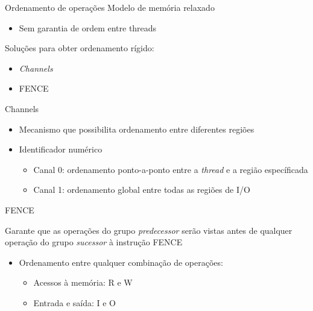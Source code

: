 \documentclass[brazil,nolapesd,aspectratio=169,noartschool]{lapesd-slides}
\begin{document}
	\begin{frame}{Ordenamento de operações}
		Modelo de memória relaxado
		\begin{itemize}
			\item Sem garantia de ordem entre threads
		\end{itemize}

		\vspace{1em}

		Soluções para obter ordenamento rígido:
		\begin{itemize}
			\item \textit{Channels}
			\item FENCE
		\end{itemize}
	\end{frame}

	\begin{frame}{Channels}
		\begin{itemize}
			\item Mecanismo que possibilita ordenamento entre diferentes regiões
			\item Identificador numérico
			\begin{itemize}
				\item Canal 0: ordenamento ponto-a-ponto entre a \textit{thread} e a região específicada
				\item Canal 1: ordenamento global entre todas as regiões de I/O
			\end{itemize}
		\end{itemize}
	\end{frame}

	\begin{frame}{FENCE}

		Garante que as operações do grupo \textit{predecessor} serão vistas antes de qualquer operação
		do grupo \textit{sucessor} à instrução FENCE

		\vspace{1em}

		\begin{itemize}
			\item Ordenamento entre qualquer combinação de operações:
			\begin{itemize}
				\item Acessos à memória: R e W
				\item Entrada e saída: I e O
			\end{itemize}
		\end{itemize}
	\end{frame}
\end{document}
